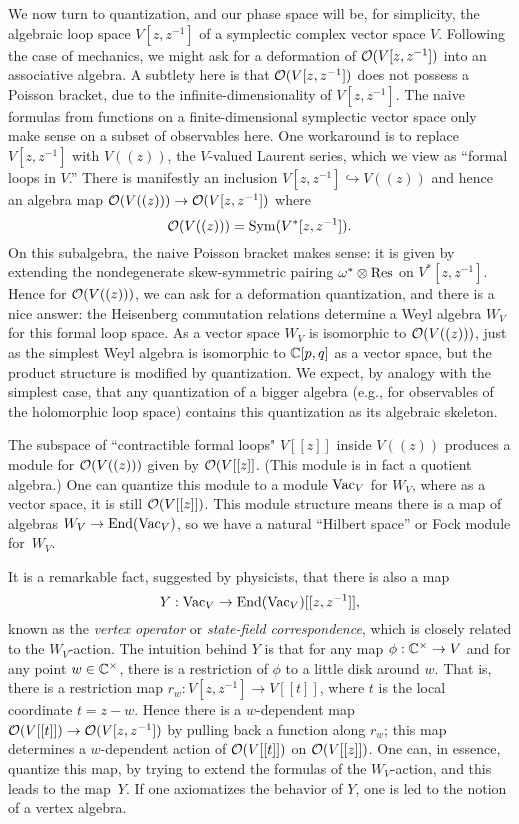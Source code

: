 \documentclass[11pt]{amsart}
\begin{document}
We now turn to quantization, and our phase space will be, for simplicity, the algebraic loop space $V[z,z^{-1}]$ of a symplectic complex vector space $V$.
Following the case of mechanics, we might ask for a deformation of $\mathcal O(V[z,z^{-1}])$ into an associative algebra.
A subtlety here is that $\mathcal O(V[z,z^{-1}])$ does not possess a Poisson bracket, 
due to the  infinite-dimensionality of $V[z,z^{-1}]$.
The naive formulas from functions on a finite-dimensional symplectic vector space only make sense on a subset of observables here.
One workaround is to replace $V[z,z^{-1}]$ with $V((z))$, the $V$-valued Laurent series,
which we view as ``formal loops in $V$.''
There is manifestly an inclusion $V[z,z^{-1}] \hookrightarrow V((z))$ and hence an algebra map $\mathcal O(V((z))) \to \mathcal O(V[z,z^{-1}])$
where 
\[
\mathcal O(V((z))) = \operatorname{Sym}(V^* [z,z^{-1}]).
\]
On this subalgebra, the naive Poisson bracket makes sense: it is given by extending the nondegenerate skew-symmetric pairing $\omega^* \otimes {\rm Res}$ on $V^* [z,z^{-1}]$.
Hence for $\mathcal O(V((z)))$, we can ask for a deformation quantization,
and there is a nice answer: 
the Heisenberg commutation relations determine a Weyl algebra $W_{V}$ for this formal loop space.
As a vector space $W_V$ is isomorphic to $\mathcal O(V((z)))$, 
just as the simplest Weyl algebra is isomorphic to $\mathbb C[p,q]$ as a vector space,
but the product structure is modified by quantization.
We expect, by analogy with the simplest case, that any quantization of a bigger algebra (e.g., for observables of the holomorphic loop space) contains this quantization as its algebraic skeleton.

The subspace of ``contractible formal loops" $V[[z]]$ inside $V((z))$ produces a module for $\mathcal O(V((z)))$ given by $\mathcal O(V[[z]]$. 
(This module is in fact a quotient algebra.)
One can quantize this module to a module ${\rm Vac}_V$ for $W_V$,
where as a vector space, it is still $\mathcal O(V[[z]])$.
This module structure means there is a map of algebras $W_V \to {\rm End}({\rm Vac}_V)$,
so we have a natural ``Hilbert space'' or Fock module for~$W_V$.

It is a remarkable fact, suggested by physicists, that there is also a map
\[
Y: {\rm Vac}_V \to {\rm End}({\rm Vac}_V)[[z, z^{-1}]],
\]
known as the {\em vertex operator} or {\em state-field correspondence},
which is closely related to the $W_V$-action.
The intuition behind $Y$ is that for any map $\phi: \mathbb C^\times \to V$ and for any point $w \in \mathbb C^\times$, 
there is a restriction of $\phi$ to a little disk around $w$.
That is, there is a restriction map $r_w: V[z,z^{-1}] \to V[[t]]$, where $t$ is the local coordinate $t = z-w$.
Hence there is a $w$-dependent map $\mathcal O(V[[t]]) \to \mathcal O(V[z,z^{-1}])$ by pulling back a function along $r_w$;
this map determines a $w$-dependent action of $\mathcal O(V[[t]])$ on $\mathcal O(V[[z]])$.
One can, in essence, quantize this map, by trying to extend the formulas of the $W_V$-action,
and this leads to the map~$Y$.
If one axiomatizes the behavior of $Y$, one is led to the notion of a vertex algebra.
\end{document}
